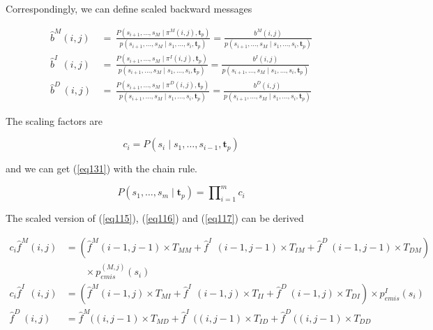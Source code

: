 \documentclass[10pt]{article}
\begin{document}
    Correspondingly, we can define scaled backward messages

    \begin{equation}
    \begin{aligned}
      \widehat{b}^{M}(i, j) \,&=\, \frac{P(s_{i+1}, \dots,s_M \;|\; \pi^M(i, j), \mathbf{t}_{p})}{p(s_{i+1}, \dots,s_M \;|\; s_1, \dots,s_{i}, \mathbf{t}_{p})} = \frac{b^{M}(i, j)}{p(s_{i+1}, \dots,s_M \;|\; s_1, \dots,s_{i}, \mathbf{t}_{p})} \\
      \widehat{b}^{I\;\;}(i, j) \,&=\, \frac{P(s_{i+1}, \dots,s_M \;|\; \pi^{I}(i, j), \mathbf{t}_{p})}{p(s_{i+1}, \dots,s_M \;|\; s_1, \dots,s_{i}, \mathbf{t}_{p})} = \frac{b^{I}(i, j)}{p(s_{i+1}, \dots,s_M \;|\; s_1, \dots,s_{i}, \mathbf{t}_{p})} \\
      \widehat{b}^{D\;}(i, j) \,&=\, \frac{P(s_{i+1}, \dots,s_M \;|\; \pi^{D}(i, j), \mathbf{t}_{p})}{p(s_{i+1}, \dots,s_M \;|\; s_1, \dots,s_{i}, \mathbf{t}_{p})} = \frac{b^{D}(i, j)}{p(s_{i+1}, \dots,s_M \;|\; s_1, \dots,s_{i}, \mathbf{t}_{p})}
    \end{aligned}
    \end{equation}

    The scaling factors are

    \begin{equation}
      c_{i} = P(s_{i} \;|\; s_1, \dots,s_{i-1},\mathbf{t}_{p})
    \end{equation}

    and we can get (\ref{eq131}) with the chain rule.

    \begin{equation} \label{eq131}
      P(s_1, \dots,s_m \;|\; \mathbf{t}_{p}) = \prod\nolimits_{i=1}^{m} c_i
    \end{equation}

    The scaled version of (\ref{eq115}), (\ref{eq116}) and (\ref{eq117}) can be derived

    \begin{align}
      c_{i} \widehat{f}^{M}(i, j) &= (\widehat{f}^{M}(i-1, j-1) \times T_{MM}  + \widehat{f}^{I\;\;}(i-1, j-1) \times T_{IM} + \widehat{f}^{D\;}(i-1, j-1) \times T_{DM}) \label{eq132} \\ 
        &\qquad\times p_{emis}^{(M, j)}(s_{i}) \nonumber \\
      c_{i} \widehat{f}^{I\;\;}(i, j) &= (\widehat{f}^{M}(i-1, j) \times T_{MI}  + \widehat{f}^{I\;\;}(i-1, j) \times T_{II} + \widehat{f}^{D\;}(i-1, j) \times T_{DI}) \times p_{emis}^{I}(s_{i}) \label{eq133} \\
      \widehat{f}^{D\;}(i, j) &= \widehat{f}^{M}((i, j-1) \times T_{MD}  + \widehat{f}^{I\;\;}((i, j-1) \times T_{ID} + \widehat{f}^{D\;}((i, j-1) \times T_{DD}
    \end{align}
\end{document}
